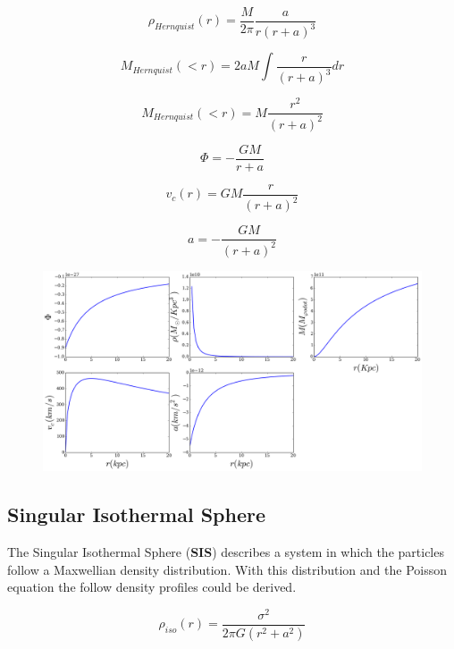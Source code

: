 \begin{equation}
\rho_{Hernquist}(r) =  \frac{M}{2\pi} \frac{a}{r(r+a)^3}
\end{equation}

\begin{equation}
M_{Hernquist}(<r) = 2aM \int \frac{r}{(r+a)^3}dr
\end{equation}

\begin{equation}
M_{Hernquist}(<r) = M \frac{r^2}{(r+a)^2}
\end{equation}

\begin{equation}
\Phi = - \frac{GM}{r+a}
\end{equation}

\begin{equation}
v_c(r) = GM \frac{r}{(r+a)^2}
\end{equation}

\begin{equation}
a = - \dfrac{GM}{(r+a)^2}
\end{equation}


\begin{figure}[H]
\centering
\includegraphics[scale=0.35]{../figures/hernquist.png}
\end{figure}



\subsection{Singular Isothermal Sphere}

The Singular Isothermal Sphere (\textbf{SIS}) describes a system in which the particles follow
a Maxwellian density distribution. With this distribution and the Poisson equation the follow
density profiles could be derived.


\begin{equation}
\rho_{iso}(r) = \dfrac{\sigma ^2}{2\pi G (r^2+a^2)}
\end{equation}

